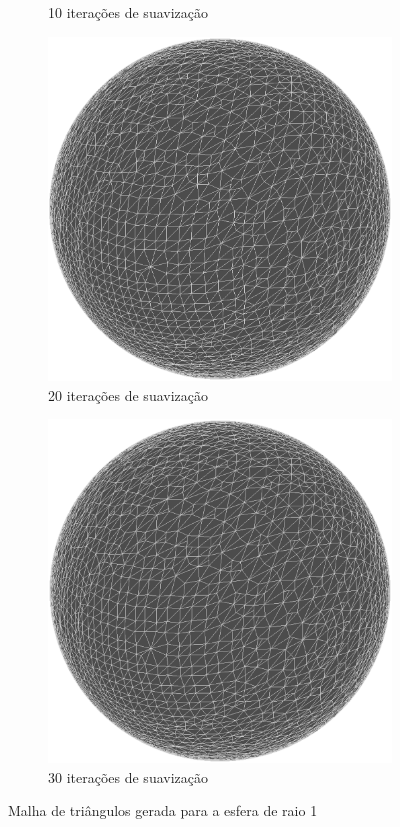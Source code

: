 \documentclass[11pt]{article}
\begin{document}
\begin{figure}
\begin{subfigure}[b]{0.45\textwidth}
				\caption{10 iterações de suavização}				
			\end{subfigure}
			\begin{subfigure}[b]{0.45\textwidth}
				\centering
				\includegraphics[width=\textwidth]{figures/20iter_sphere_mesh}
				\caption{20 iterações de suavização}				
			\end{subfigure}
			\begin{subfigure}[b]{0.45\textwidth}
				\centering
				\includegraphics[width=\textwidth]{figures/30iter_sphere_mesh}
				\caption{30 iterações de suavização}				
			\end{subfigure}
			\caption{Malha de triângulos gerada para a esfera de raio 1}
			\label{fig:mesh:sphere}
		\end{figure}
\end{document}

